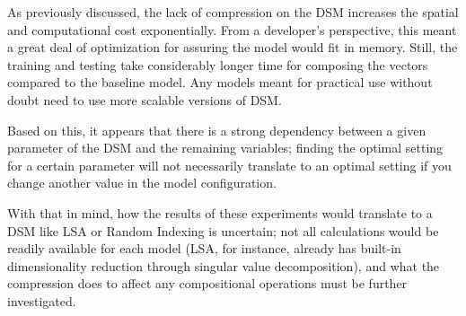 As previously discussed, the lack of compression on the DSM increases the spatial and computational cost exponentially. From a developer's perspective, this meant a great deal of optimization for assuring the model would fit in memory. Still, the training and testing take considerably longer time for composing the vectors compared to the baseline model. Any models meant for practical use without doubt need to use more scalable versions of DSM.

Based on this, it appears that there is a strong dependency between a given parameter of the DSM and the remaining variables; finding the optimal setting for a certain parameter will not necessarily translate to an optimal setting if you change another value in the model configuration.

With that in mind, how the results of these experiments would translate to a DSM like LSA or Random Indexing is uncertain; not all calculations would be readily available for each model (LSA, for instance, already has built-in dimensionality reduction through singular value decomposition), and what the compression does to affect any compositional operations must be further investigated.
